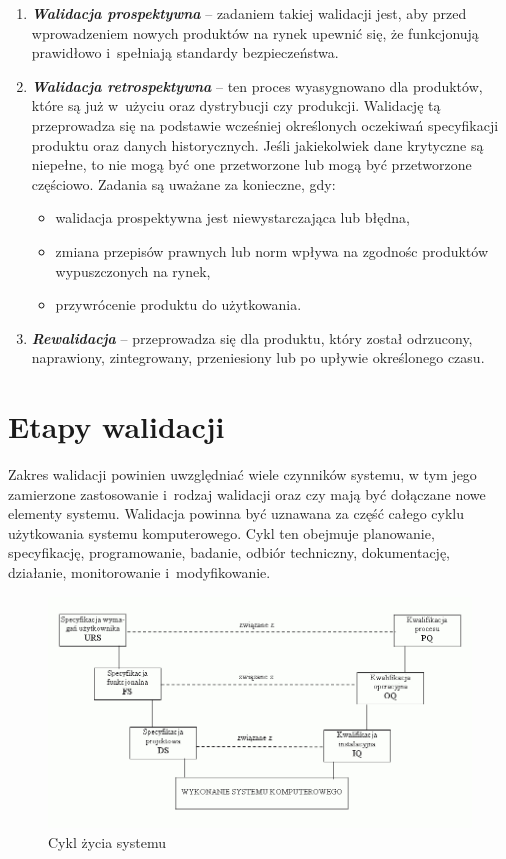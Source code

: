 \documentclass[brudnopis]{xmgr}
\begin{document}
\begin{enumerate}
  \item \textbf{\textit{Walidacja prospektywna}} – \textcolor{sa}{zadaniem takiej walidacji jest, aby przed wprowadzeniem nowych produktów na rynek upewnić się, że funkcjonują prawidłowo i~spełniają standardy bezpieczeństwa.}
  \item \textbf{\textit{Walidacja retrospektywna}} – \textcolor{sa}{ten proces wyasygnowano dla produktów, które są już w~użyciu oraz dystrybucji czy produkcji. Walidację tą przeprowadza się na podstawie wcześniej określonych oczekiwań specyfikacji produktu oraz danych historycznych. Jeśli jakiekolwiek dane krytyczne są niepełne, to nie mogą być one przetworzone lub mogą być przetworzone częściowo.} \textcolor{sb}{Zadania są uważane za konieczne, gdy:}
\begin{itemize}
\item \textcolor{sa}{walidacja prospektywna jest niewystarczająca lub błędna,}
\item \textcolor{sa}{zmiana przepisów prawnych lub norm wpływa na zgodnośc produktów wypuszczonych na rynek,}
\item \textcolor{sa}{przywrócenie produktu do użytkowania.}
\end{itemize}
  \item \textbf{\textit{Rewalidacja}} – \textcolor{sa}{przeprowadza się dla produktu, który został odrzucony, naprawiony, zintegrowany, przeniesiony lub po upływie określonego czasu.}\cite{Categories}
\end{enumerate}

\section{Etapy walidacji}
\indent \indent \indent \textcolor{sb}{Zakres walidacji powinien uwzględniać wiele czynników systemu,} \textcolor{sa}{w tym jego zamierzone zastosowanie i~rodzaj walidacji oraz czy mają być dołączane nowe elementy systemu.} \textcolor{sb}{Walidacja powinna być uznawana za część całego cyklu użytkowania systemu komputerowego.} \textcolor{sa}{Cykl ten obejmuje planowanie, specyfikację, programowanie, badanie, odbiór techniczny, dokumentację, działanie, monitorowanie i~modyfikowanie.}

\begin{figure}[th!]
\centering
\includegraphics[width=.7\hsize]{images/cykl}
\caption{Cykl życia systemu\label{RYS.3}}
\end{figure}
\end{document}
